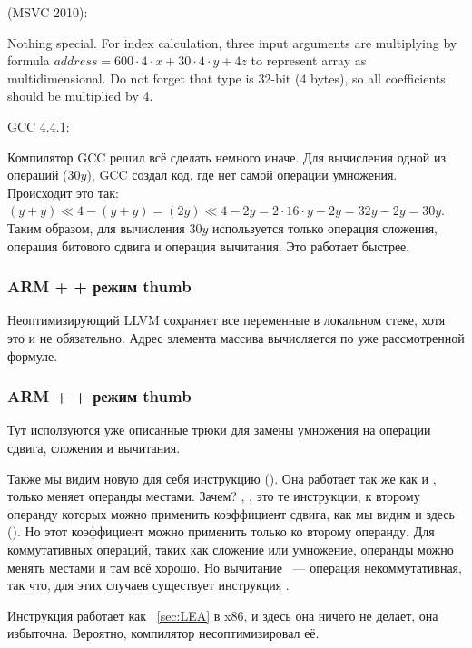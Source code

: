  (MSVC 2010):



{Nothing special. For index calculation, three input arguments are multiplying 
by formula $address=600 \cdot 4 \cdot x + 30 \cdot 4 \cdot y + 4z$ to represent array as multidimensional.
Do not forget that \Tint type is 32-bit (4 bytes), so all coefficients should be multiplied by 4.}

GCC 4.4.1:



Компилятор GCC решил всё сделать немного иначе. 
Для вычисления одной из операций ($30y$), GCC создал код, где нет самой операции умножения. 
Происходит это так: $(y+y) \ll 4 - (y+y) = (2y) \ll 4 - 2y = 2 \cdot 16 \cdot y - 2y = 32y - 2y = 30y$. 
Таким образом, для вычисления $30y$
используется только операция сложения, операция битового сдвига и операция вычитания. Это работает быстрее.

\subsubsection{ARM + \NonOptimizingXcode + режим thumb}



Неоптимизирующий LLVM сохраняет все переменные в локальном стеке, хотя это и не обязательно. 
Адрес элемента массива вычисляется по уже рассмотренной формуле.

\subsubsection{ARM + \OptimizingXcode + режим thumb}



Тут исползуются уже описанные трюки для замены умножения на операции сдвига, сложения и вычитания.

Также мы видим новую для себя инструкцию  (). 
Она работает так же как и \SUB, только меняет операнды
местами. Зачем? \SUB, , это те инструкции, к второму операнду которых можно применить коэффициент сдвига, как мы видим
и здесь (). Но этот коэффициент можно применить только ко второму операнду. 
Для коммутативных операций, таких
как сложение или умножение, операнды можно менять местами и там всё хорошо. Но вычитание ~--- операция некоммутативная,
так что, для этих случаев существует инструкция .

Инструкция  работает как \LEA~\ref{sec:LEA} в x86, и здесь она ничего не делает, она избыточна. 
Вероятно, компилятор несоптимизировал её.

